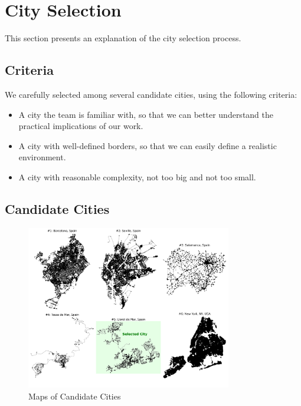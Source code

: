 \section{City Selection}
\label{sec:city-selection}

This section presents an explanation of the city selection process.

\subsection{Criteria}

We carefully selected among several candidate cities, using the following criteria:

\begin{itemize}
    \item A city the team is familiar with, so that we can better understand the practical implications of our work.
    \item A city with well-defined borders, so that we can easily define a realistic environment.
    \item A city with reasonable complexity, not too big and not too small.
\end{itemize}

\subsection{Candidate Cities}

\begin{figure}
    \centering
    \includegraphics[width=0.8\textwidth]{../figures/maps_of_candidate_cities.png}
    \caption{Maps of Candidate Cities}
    \label{fig:candidate-cities}
\end{figure}

